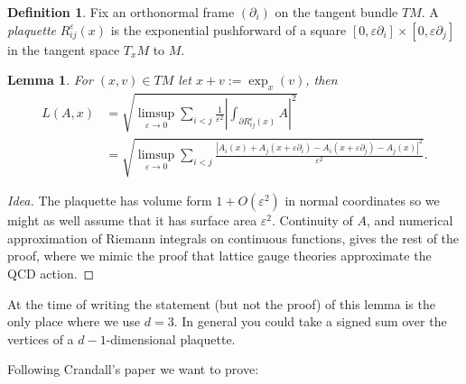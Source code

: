 \documentclass[reqno,11pt]{amsart}
\newcommand{\dfn}[1]{\emph{#1}\index{#1}}
\newtheorem{lemma}[theorem]{Lemma}
\theoremstyle{definition}
\newtheorem{definition}[theorem]{Definition}
\numberwithin{equation}{section}
\begin{document}
\begin{definition}
Fix an orthonormal frame $(\partial_i)$ on the tangent bundle $TM$.
A \dfn{plaquette} $R_{ij}^\varepsilon(x)$ is the exponential pushforward of a square $[0, \varepsilon \partial_i] \times [0, \varepsilon \partial_j]$ in the tangent space $T_x M$ to $M$.
\end{definition}

\begin{lemma}
For $(x, v) \in TM$ let $x + v := \exp_x(v)$, then
\begin{align*}
	L(A, x) 
	&= \sqrt{\limsup_{\varepsilon \to 0} \sum_{i < j} \frac{1}{\varepsilon^2} \left|\int_{\partial R_{ij}^\varepsilon(x)} A\right|^2}\\
	&= \sqrt{\limsup_{\varepsilon \to 0} \sum_{i < j} \frac{|A_i(x) + A_j(x + \varepsilon \partial_i) - A_i(x + \varepsilon \partial_j) - A_j(x)|^2}{\varepsilon^2}}.
\end{align*}
\end{lemma}
\begin{proof}[Idea]
The plaquette has volume form $1 + O(\varepsilon^2)$ in normal coordinates so we might as well assume that it has surface area $\varepsilon^2$.
Continuity of $A$, and numerical approximation of Riemann integrals on continuous functions, gives the rest of the proof, where we mimic the proof that lattice gauge theories approximate the QCD action.
\end{proof}

At the time of writing the statement (but not the proof) of this lemma is the only place where we use $d = 3$.
In general you could take a signed sum over the vertices of a $d-1$-dimensional plaquette.

Following Crandall's paper we want to prove:
\end{document}
